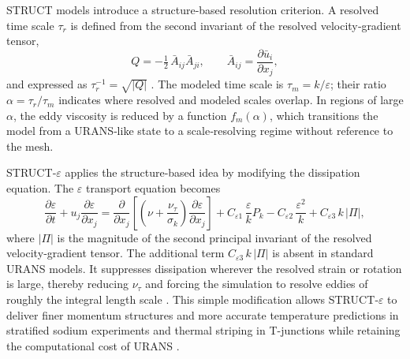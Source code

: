 \documentclass[review]{elsarticle}
\theoremstyle{definition}
\theoremstyle{definition}
\theoremstyle{remark}
\begin{document}
STRUCT models introduce a structure‑based resolution criterion.  A resolved time scale \(\tau_r\) is defined from the second invariant of the resolved velocity‑gradient tensor,
\[
Q = -\tfrac12\,\bar{A}_{ij}\bar{A}_{ji},\qquad \bar{A}_{ij} = \frac{\partial \bar{u}_i}{\partial x_j},
\]
and expressed as \(\tau_r^{-1}=\sqrt{|Q|}\) \citep{BagliettoNinokata2006}.  The modeled time scale is \(\tau_m = k/\varepsilon\); their ratio \(\alpha=\tau_r/\tau_m\) indicates where resolved and modeled scales overlap.  In regions of large \(\alpha\), the eddy viscosity is reduced by a function \(f_m(\alpha)\), which transitions the model from a URANS‑like state to a scale‑resolving regime without reference to the mesh.

STRUCT‑\(\varepsilon\) applies the structure‑based idea by modifying the dissipation equation.  The \(\varepsilon\) transport equation becomes
\begin{equation}
\frac{\partial \varepsilon}{\partial t}+u_j\frac{\partial \varepsilon}{\partial x_j}
= \frac{\partial}{\partial x_j}\left[\left(\nu+\frac{\nu_{\tau}}{\sigma_{k}}\right)\frac{\partial \varepsilon}{\partial x_j}\right]
+ C_{\varepsilon 1}\,\frac{\varepsilon}{k}P_k
- C_{\varepsilon 2}\,\frac{\varepsilon^2}{k}
+ C_{\varepsilon 3}\,k\,|\Pi|,
\label{eq:struct_eps}
\end{equation}
where \( |\Pi|\) is the magnitude of the second principal invariant of the resolved velocity‑gradient tensor.  The additional term \(C_{\varepsilon 3}\,k\,|\Pi|\) is absent in standard URANS models. It suppresses dissipation wherever the resolved strain or rotation is large, thereby reducing \(\nu_{\tau}\) and forcing the simulation to resolve eddies of roughly the integral length scale \citep{Wiser2022}.  This simple modification allows STRUCT‑\(\varepsilon\) to deliver finer momentum structures and more accurate temperature predictions in stratified sodium experiments and thermal striping in T-junctions while retaining the computational cost of URANS \citep{Wiser2022,FENG2020110572}.
\end{document}

